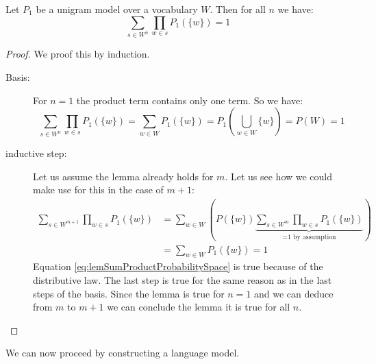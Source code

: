 \documentclass[•]{book}
\begin{document}
\begin{lemma}\label{lem:sumProductProbabilitySpace}
Let $P_1$ be a unigram model over a vocabulary $W$. Then for all $n$ we have:
\[
\sum_{s\in W^n}\prod_{w\in s}P_1(\{w\}) =1
\]
\end{lemma}
\begin{proof}
We proof this by induction.
\begin{description}
\item[Basis:] For $n=1$ the product term contains only one term. So we have:
\[
\sum_{s\in W^n}\prod_{w\in s}P_1(\{w\}) = \sum_{w\in W}P_1(\{w\}) = P_1(\bigcup_{w\in W}\{w\}) = P(W) =  1
\]

\item[inductive step:] Let us assume the lemma already holds for $m$. Let us see how we could make use for this in the case of $m+1$:
\begin{align}
 \sum_{s\in W^{m+1}}\prod_{w\in s}P_1(\{w\}) & = \sum_{w\in W}\left(P(\{w\})\underbrace{ \sum_{s\in W^m}\prod_{w\in s}P_1(\{w\}) } _{\text{=1 by assumption}}\right) \label{eq:lemSumProductProbabilitySpace}  \\
 &= \sum_{w\in W}P_1(\{w\}) = 1
\end{align}
Equation \ref{eq:lemSumProductProbabilitySpace} is true because of the distributive law.
The last step is true for the same reason as in the last steps of the basis.
Since the lemma is true for $n=1$ and we can deduce from $m$ to $m+1$ we can conclude the lemma it is true for all $n$.
\end{description}
\end{proof}

We can now proceed by constructing a language model.
\end{document}
